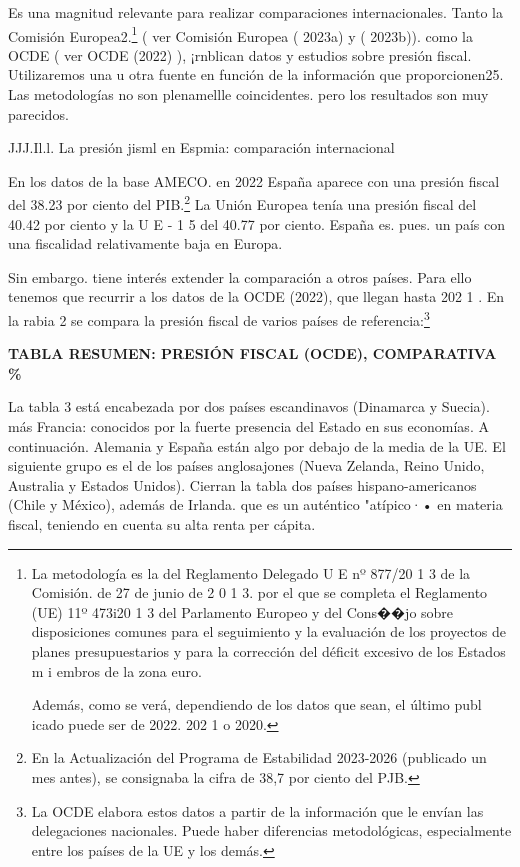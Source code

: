 \documentclass[10pt,a4paper]{article}
\begin{document}
Es una magnitud relevante para realizar comparaciones internacionales. Tanto la Comisión Europea2.\footnote{%
    La metodología es la del Reglamento Delegado U E nº 877/20 1 3 de la Comisión. de 27 de junio de 2 0 1 3. por el que se completa el Reglamento (UE) 11º 473i20 1 3 del Parlamento Europeo y del Cons��jo sobre disposiciones comunes para el seguimiento y la evaluación de los proyectos de planes presupuestarios y para la corrección del déficit excesivo de los Estados m i embros de la zona euro.

Además, como se verá, dependiendo de los datos que sean, el último publ icado puede ser de 2022. 202 1 o 2020.
} ( ver Comisión Europea ( 2023a) y ( 2023b)). como la OCDE ( ver OCDE (2022) ), ¡rnblican datos y estudios sobre presión fiscal. Utilizaremos una u otra fuente en función de la información que proporcionen25. Las metodologías no son plenamellle coincidentes. pero los resultados son muy parecidos.

JJJ.Il.l. La presión jisml en Espmia: comparación internacional

En los datos de la base AMECO. en 2022 España aparece con una presión fiscal del 38.23 por ciento del PIB.\footnote{%
    En la Actualización del Programa de Estabilidad 2023-2026 (publicado un mes antes), se consignaba la cifra de 38,7 por ciento del PJB.
} La Unión Europea tenía una presión fiscal del 40.42 por ciento y la U E - 1 5 del 40.77 por ciento. España es. pues. un país con una fiscalidad relativamente baja en Europa.

Sin embargo. tiene interés extender la comparación a otros países. Para ello tenemos que recurrir a los datos de la OCDE (2022), que llegan hasta 202 1 . En la rabia 2 se compara la presión fiscal de varios países de referencia:\footnote{%
    La OCDE elabora estos datos a partir de la información que le envían las delegaciones nacionales. Puede haber diferencias metodológicas, especialmente entre los países de la UE y los demás.
}

\textbf{TABLA RESUMEN: PRESIÓN FISCAL (OCDE), COMPARATIVA \%}

La tabla 3 está encabezada por dos países escandinavos (Dinamarca y Suecia). más Francia: conocidos por la fuerte presencia del Estado en sus economías. A continuación. Alemania y España están algo por debajo de la media de la UE. El siguiente grupo es el de los países anglosajones (Nueva Zelanda, Reino Unido, Australia y Estados Unidos). Cierran la tabla dos países hispano-americanos (Chile y México), además de Irlanda. que es un auténtico "atípico·• en materia fiscal, teniendo en cuenta su alta renta per cápita.
\end{document}
